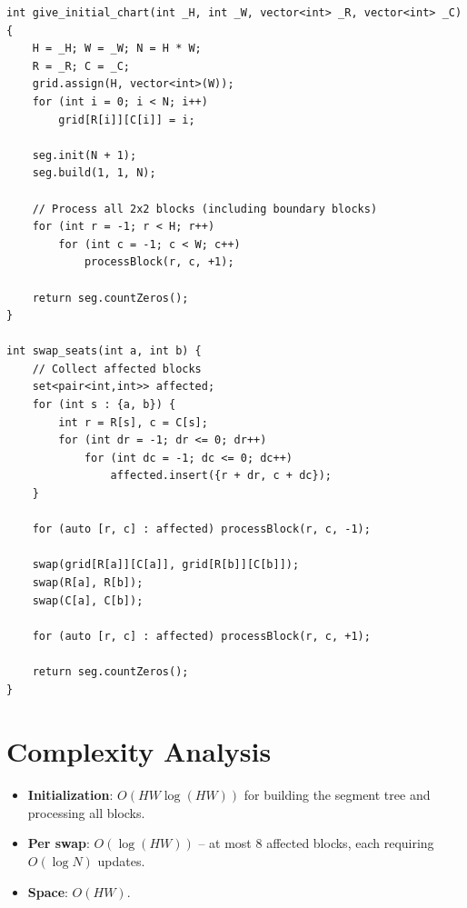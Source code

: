 \documentclass[11pt,a4paper]{article}
\begin{document}
\begin{lstlisting}
int give_initial_chart(int _H, int _W, vector<int> _R, vector<int> _C) {
    H = _H; W = _W; N = H * W;
    R = _R; C = _C;
    grid.assign(H, vector<int>(W));
    for (int i = 0; i < N; i++)
        grid[R[i]][C[i]] = i;

    seg.init(N + 1);
    seg.build(1, 1, N);

    // Process all 2x2 blocks (including boundary blocks)
    for (int r = -1; r < H; r++)
        for (int c = -1; c < W; c++)
            processBlock(r, c, +1);

    return seg.countZeros();
}

int swap_seats(int a, int b) {
    // Collect affected blocks
    set<pair<int,int>> affected;
    for (int s : {a, b}) {
        int r = R[s], c = C[s];
        for (int dr = -1; dr <= 0; dr++)
            for (int dc = -1; dc <= 0; dc++)
                affected.insert({r + dr, c + dc});
    }

    for (auto [r, c] : affected) processBlock(r, c, -1);

    swap(grid[R[a]][C[a]], grid[R[b]][C[b]]);
    swap(R[a], R[b]);
    swap(C[a], C[b]);

    for (auto [r, c] : affected) processBlock(r, c, +1);

    return seg.countZeros();
}
\end{lstlisting}

\section{Complexity Analysis}

\begin{itemize}
  \item \textbf{Initialization}: $O(HW \log(HW))$ for building the segment tree and processing all blocks.
  \item \textbf{Per swap}: $O(\log(HW))$ -- at most 8 affected blocks, each requiring $O(\log N)$ updates.
  \item \textbf{Space}: $O(HW)$.
\end{itemize}
\end{document}
